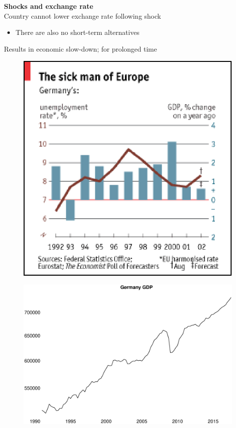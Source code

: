 \documentclass{beamer}
\begin{document}
\begin{frame}
  \textbf{Shocks and exchange rate}\\
  \medskip
  Country cannot lower exchange rate following shock  
  \begin{itemize}
    \item There are also no short-term alternatives
  \end{itemize}
   Results in economic slow-down; for prolonged time  
  \begin{figure}
    \includegraphics[scale=.4]{sick_man.eps}
  \end{figure}
\end{frame}

\begin{frame}
  \begin{figure}
    \includegraphics[scale=.3]{germany_gdp.eps}
  \end{figure}
\end{frame}
\end{document}

